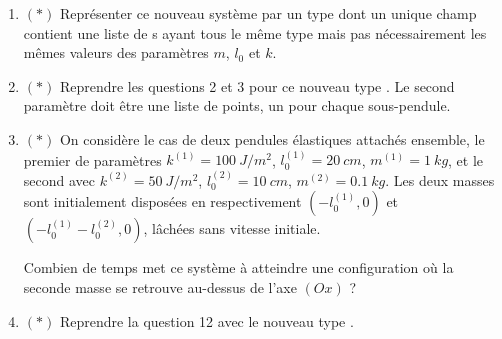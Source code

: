 \documentclass{article}
\newcommand{\der}[2]{#1^{\ensuremath{\left(#2\right)}}}
\begin{document}
\begin{enumerate}[resume]
	\item $(*)$ Représenter ce nouveau système par un type  dont un unique champ contient une liste de s ayant tous le même type mais pas nécessairement les mêmes valeurs des paramètres $m$, $l_0$ et $k$.
	\item $(*)$ Reprendre les questions 2 et 3 pour ce nouveau type . Le second paramètre  doit être une liste de points, un pour chaque sous-pendule.
	\item $(*)$ On considère le cas de deux pendules élastiques attachés ensemble, le premier de paramètres $\der k1 = \qty{100}{J/m^2}$, $\der{l_0}1 = \qty{20}{cm}$, $\der m1 = \qty{1}{kg}$, et le second avec $\der k2 = \qty{50}{J/m^2}$, $\der{l_0}2 = \qty{10}{cm}$, $\der m2 = \qty{0.1}{kg}$. Les deux masses sont initialement disposées en respectivement $(-\der{l_0}1, 0)$ et $(-\der{l_0}1-\der{l_0}2, 0)$, lâchées sans vitesse initiale.

	Combien de temps met ce système à atteindre une configuration où la seconde masse se retrouve au-dessus de l'axe $(Ox)$ ?
	\item $(*)$ Reprendre la question 12 avec le nouveau type .
\end{enumerate}
\end{document}
